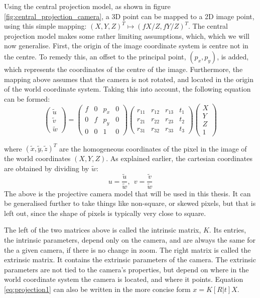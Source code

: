 Using the central projection model, as shown in figure \ref{fig:central_projection_camera}, a 3D point can be mapped to a 2D image point, using this simple mapping: $(X,Y,Z)^T\mapsto(fX/Z,fY/Z)^T$.
The central projection model makes some rather limiting assumptions, which, which we will now generalise.
First, the origin of the image coordinate system is centre not in the centre.
To remedy this, an offset to the principal point, $(p_{x}, p_{y})$, is added, which represents the coordinates of the centre of the image.
Furthermore, the mapping above assumes that the camera is not rotated, and located in the origin of the world coordinate system. Taking this into account, the following equation can be formed:
\begin{equation}\label{eq:projection1}
\begin{pmatrix}	\tilde{u}\\\tilde{v}\\\tilde{w}\end{pmatrix} = 
\begin{pmatrix}
	f & 0 & p_{x} & 0\\
	0 & f & p_{y} & 0\\
	0 & 0 & 1 & 0
\end{pmatrix}
\begin{pmatrix}
	r_{11} & r_{12} & r_{13} & t_{1}\\
	r_{21} & r_{22} & r_{23} & t_{2}\\
	r_{31} & r_{32} & r_{33} & t_{3}
\end{pmatrix}
\begin{pmatrix}	X\\Y\\Z\\1\end{pmatrix}
\end{equation}

where $(\tilde{x},\tilde{y},\tilde{z})^T$ are the homogeneous coordinates of the pixel in the image of the world coordinates $(X,Y,Z)$.
As explained earlier, the cartesian coordinates are obtained by dividing by $\tilde{w}$:
$$
u = \frac{\tilde{u}}{\tilde{w}},~~v = \frac{\tilde{v}}{\tilde{w}}
$$
The above is the projective camera model that will be used in this thesis. 
It can be generalised further to take things like non-square, or skewed pixels, but that is left out, since the shape of pixels is typically very close to square.

The left of the two matrices above is called the intrinsic matrix, $K$.
Its entries, the intrinsic parameters, depend only on the camera, and are always the same for the a given camera, if there is no change in zoom.
The right matrix is called the extrinsic matrix.
It contains the extrinsic parameters of the camera.
The extrinsic parameters are not tied to the camera's properties, but depend on where in the world coordinate system the camera is located, and where it points.
Equation \ref{eq:projection1} can also be written in the more concise form $x = K[R|t]X$.

